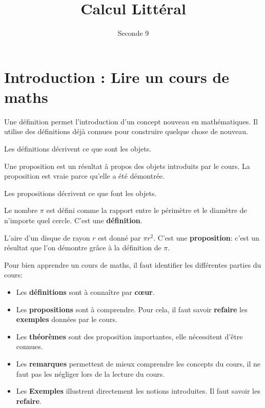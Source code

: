 \documentclass{article}
\author{Seconde 9}
\date{}
\title{Calcul Littéral}
\begin{document}
\maketitle
\section{Introduction : Lire un cours de maths}
\begin{tcolorbox}
\begin{definition}
Une définition permet l'introduction d'un concept nouveau en mathématiques. Il utilise des définitions déjà connues pour construire quelque chose de nouveau.
\end{definition}
\end{tcolorbox}
Les définitions décrivent ce que sont les objets.
\begin{proposition}
Une proposition est un résultat à propos des objets introduits par le cours. La proposition est vraie parce qu'elle a été démontrée.
\end{proposition}
Les propositions décrivent ce que font les objets.
\begin{example}
Le nombre $\pi$ est défini comme la rapport entre le périmètre et le diamètre de n'importe quel cercle. C'est une \textbf{définition}.

L'aire d'un disque de rayon $r$ est donné par $\pi r^2$. C'est une \textbf{proposition}: c'est un résultat que l'on démontre grâce à la définition de $\pi$.
\end{example}
\begin{remark}
Pour bien apprendre un cours de maths, il faut identifier les différentes parties du cours: 
\begin{itemize}
\item Les \textbf{définitions} sont à connaître par \textbf{cœur}.
\item Les \textbf{propositions} sont à comprendre. Pour cela, il faut savoir \textbf{refaire} les \textbf{exemples} données par le cours.
\item Les \textbf{théorèmes} sont des proposition importantes, elle nécessitent d'être connues.
\item Les \textbf{remarques} permettent de mieux comprendre les concepts du cours, il ne faut pas les négliger lors de la lecture du cours.
\item Les \textbf{Exemples} illustrent directement les notions introduites. Il faut savoir les \textbf{refaire}.
\end{itemize}
\end{remark}
\newpage
\end{document}
